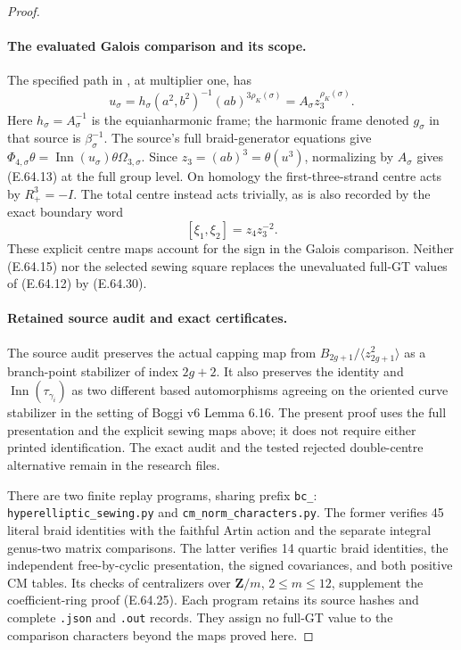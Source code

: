 \begin{proof}
\paragraph{The evaluated Galois comparison and its scope.}
The specified path in
\cite[Proposition 4.11, Section 4.12, Proposition 4.13]
 {DE_NakamuraTsunogaiYasuda2010}, at multiplier one, has
\[
 u_\sigma=h_\sigma(a^2,b^2)^{-1}(ab)^{3\rho_K(\sigma)}
           =A_\sigma z_3^{\rho_K(\sigma)}.
 \tag{E.64.30}
\]
Here $h_\sigma=A_\sigma^{-1}$ is the equianharmonic frame;
the harmonic frame denoted $g_\sigma$ in that source is
$\beta_\sigma^{-1}$.  The source's full braid-generator
equations give
$\Phi_{4,\sigma}\theta=
\operatorname{Inn}(u_\sigma)\theta\Omega_{3,\sigma}$.
Since $z_3=(ab)^3=\theta(u^3)$, normalizing by $A_\sigma$
gives (E.64.13) at the full group level.  On homology the
first-three-strand centre acts by $R_+^3=-I$.
The total centre instead acts trivially, as is also recorded
by the exact boundary word
\[
                   [\xi_1,\xi_2]=z_4z_3^{-2}.
 \tag{E.64.31}
\]
These explicit centre maps account for the sign in the
Galois comparison.  Neither (E.64.15) nor the selected
sewing square replaces the unevaluated full-GT values of
(E.64.12) by (E.64.30).

\paragraph{Retained source audit and exact certificates.}
The source audit preserves the actual capping map from
$B_{2g+1}/\langle z_{2g+1}^2\rangle$ as a branch-point
stabilizer of index $2g+2$.  It also preserves the identity
and $\operatorname{Inn}(\tau_{\gamma_i})$ as two different
based automorphisms agreeing on the oriented curve
stabilizer in the setting of Boggi v6 Lemma 6.16.  The
present proof uses the full presentation and the explicit
sewing maps above; it does not require either printed
identification.  The exact audit and the tested rejected
double-centre alternative remain in the research files.

There are two finite replay programs, sharing prefix
\texttt{bc\_}: \texttt{hyperelliptic\_sewing.py} and
\texttt{cm\_norm\_characters.py}.  The former verifies 45
literal braid identities with the faithful Artin action
and the separate integral genus-two matrix comparisons.
The latter verifies 14 quartic braid identities, the
independent free-by-cyclic presentation, the signed
covariances, and both positive CM tables.  Its checks of
centralizers over $\mathbf Z/m$, $2\leq m\leq12$, supplement
the coefficient-ring proof (E.64.25).  Each program retains
its source hashes and complete \texttt{.json} and
\texttt{.out} records.  They assign no full-GT value to the
comparison characters beyond the maps proved here.
\end{proof}
